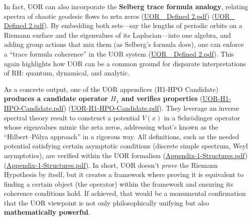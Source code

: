\documentclass[12pt]{article}
\begin{document}
\medskip

In fact, UOR can also incorporate the \textbf{Selberg trace formula analogy}, relating spectra of chaotic geodesic flows to zeta zeros (\href{file://file-TBF3nHDaRR5QeVMmwCFYkp#:~:text=hyperbolic%20surface%2C%20it%20equates%20the,lambda_n%7D%24%20%28or%20frequencies}{UOR\_ Defined 2.pdf}) (\href{file://file-TBF3nHDaRR5QeVMmwCFYkp#:~:text=Clifford%20algebra%3A%20one%20part%20of,lambda_n%7D%24%20%28or%20frequencies}{UOR\_ Defined 2.pdf}). By embedding both sets---say the lengths of periodic orbits on a Riemann surface and the eigenvalues of its Laplacian---into one algebra, and adding group actions that mix them (as Selberg’s formula does), one can enforce a ``trace formula coherence'' in the UOR system (\href{file://file-TBF3nHDaRR5QeVMmwCFYkp#:~:text=provides%20a%20bridge%20between%20spectral,lambda_n%7D%24%20%28or%20frequencies}{UOR\_ Defined 2.pdf}). This again highlights how UOR can be a common ground for disparate interpretations of RH: quantum, dynamical, and analytic.

\medskip

As a concrete output, one of the UOR appendices (H1-HPO Candidate) \textbf{produces a candidate operator $H_1$ and verifies properties} (\href{file://file-37Uvw8H22xQXFcjENiSvuE#:~:text=1%20Introduction%20%26%20Motivation}{UOR-H1-HPO-Candidate.pdf}) (\href{file://file-37Uvw8H22xQXFcjENiSvuE#:~:text=number%20theory%20and%20spectral%20theory,number%20theory%20with%20mathematical%20physics}{UOR-H1-HPO-Candidate.pdf}). They leverage an inverse spectral theory result to construct a potential $V(x)$ in a Schrödinger operator whose eigenvalues mimic the zeta zeros, addressing what’s known as the ``Hilbert--P\'olya approach'' in a rigorous way. All definitions, such as the needed potential satisfying certain asymptotic conditions (discrete simple spectrum, Weyl asymptotics), are verified within the UOR formalism (\href{file://file-3gYgBpjuoJ5q18fgqMiTLR#:~:text=data%20satisfies%20the%20standard%20conditions,In%20particular%2C%20we%20verify}{Appendix-1-Structures.pdf}) (\href{file://file-3gYgBpjuoJ5q18fgqMiTLR#:~:text=%E2%80%A2%20Asymptotic%20Eigenvalue%20Spacing%3A%20The,we%20require%E2%88%9A}{Appendix-1-Structures.pdf}). In short, UOR doesn’t \emph{prove} the Riemann Hypothesis by itself, but it creates a framework where proving it is equivalent to finding a certain object (the operator) within the framework and ensuring its coherence conditions hold. If achieved, that would be a monumental confirmation that the UOR viewpoint is not only philosophically unifying but also \textbf{mathematically powerful}.
\end{document}
